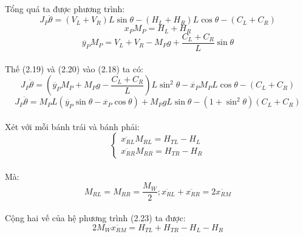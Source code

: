 \begin{itemize}
\paragraph{}Tổng quá ta được phương trình: 
\begin{equation}
J_{P}\ddot{\theta} = (V_{L} + V_{R})L\sin{\theta} - (H_{L} + H_{R})L\cos{\theta} - (C_{L} + C_{R})
\end{equation} 
\begin{equation}
x_{P}M_{P} = H_{L} + H_{R}
\end{equation}
\begin{equation}
\ddot{y_{P}}M_{P} = V_{L} + V_{R} - M_{P}g + \dfrac{C_{L}+C_{R}}{L}\sin{\theta}
\end{equation}
\end{itemize}
\paragraph{} Thế (2.19) và (2.20) vào (2.18) ta có: 
\begin{equation}
J_{P}\ddot{\theta} = (\ddot{y_{P}}M_{P} + M_{P}g - \dfrac{C_{L}+C_{R}}{L})L\sin^{2}{\theta} - \ddot{x_{P}}M_{P}L\cos{\theta} - (C_{L} + C_{R})
\end{equation}
\begin{equation}
J_{P}\ddot{\theta} = M_{P}L(\ddot{y_{P}}\sin{\theta} - \ddot{x_{P}}\cos{\theta}) + M_{P}gL\sin{\theta} - (1 + \sin^{2}{\theta})(C_{L}+C_{R})
\end{equation}
\paragraph{}Xét với mỗi bánh trái và bánh phải: 
\begin{equation}
\begin{cases}
\ddot{x_{RL}}M_{RL} = H_{TL} - H_{L} \\
\ddot{x_{RR}}M_{RR} = H_{TR} - H_{R} 
\end{cases}
\end{equation}
\paragraph{}Mà: 
\begin{equation}
M_{RL} = M_{RR} = \dfrac{M_{W}}{2} ; \ddot{x_{RL}} + \ddot{x_{RR}} = 2\ddot{x_{RM}}
\end{equation}
\paragraph{}Cộng hai vế của hệ phương trình (2.23) ta được:
\begin{equation}
2M_{W}\ddot{x_{RM}} = H_{TL} + H_{TR} - H_{L} - H_{R}
\end{equation}
